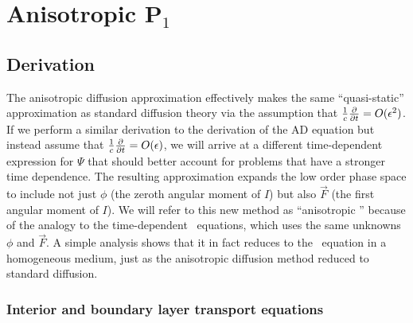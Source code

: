 
\chapter{Anisotropic P$_1$}\label{chap:aponeDerivation}

\section{Derivation}

The anisotropic diffusion approximation effectively makes the same
``quasi-static'' approximation as standard diffusion theory via the assumption
that
$\frac1c\frac{\partial }{\partial t}=O(\epsilon^2)$. If we perform a similar derivation to the
derivation of the AD equation but instead assume that
$\frac1c\frac{\partial }{\partial t}=O(\epsilon)$, we will
arrive at a different time-dependent expression for $\Psi$ that
should better account for problems that have a stronger time dependence.
The resulting approximation expands the low order phase
space to include not just $\phi$ (the zeroth angular moment of $I$) but also
$\vec{F}$ (the first angular moment of $I$). We will refer to this new method
as ``anisotropic \Pone'' because of the analogy to the time-dependent \Pone\
equations, which uses the same unknowns $\phi$ and $\vec{F}$. A simple analysis
shows that it in fact reduces to the \Pone\ equation in a homogeneous medium,
just as the anisotropic diffusion method reduced to standard diffusion.

\subsection{Interior and boundary layer transport equations}

